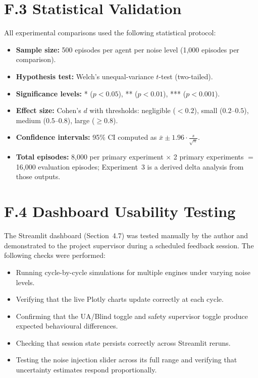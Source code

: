 \documentclass[12pt,a4paper]{report}
\begin{document}
\section*{F.3 Statistical Validation}

All experimental comparisons used the following statistical protocol:

\begin{itemize}
    \item \textbf{Sample size:} 500 episodes per agent per noise level (1,000 episodes per comparison).
    \item \textbf{Hypothesis test:} Welch's unequal-variance $t$-test (two-tailed).
    \item \textbf{Significance levels:} * ($p < 0.05$), ** ($p < 0.01$), *** ($p < 0.001$).
    \item \textbf{Effect size:} Cohen's $d$ with thresholds: negligible ($< 0.2$), small ($0.2$--$0.5$), medium ($0.5$--$0.8$), large ($\geq 0.8$).
    \item \textbf{Confidence intervals:} 95\% CI computed as $\bar{x} \pm 1.96 \cdot \frac{s}{\sqrt{n}}$.
    \item \textbf{Total episodes:} 8,000 per primary experiment $\times$ 2 primary experiments $=$ 16,000 evaluation episodes; Experiment~3 is a derived delta analysis from those outputs.
\end{itemize}

\section*{F.4 Dashboard Usability Testing}

The Streamlit dashboard (Section~4.7) was tested manually by the author and demonstrated to the project supervisor during a scheduled feedback session. The following checks were performed:

\begin{itemize}
    \item Running cycle-by-cycle simulations for multiple engines under varying noise levels.
    \item Verifying that the live Plotly charts update correctly at each cycle.
    \item Confirming that the UA/Blind toggle and safety supervisor toggle produce expected behavioural differences.
    \item Checking that session state persists correctly across Streamlit reruns.
    \item Testing the noise injection slider across its full range and verifying that uncertainty estimates respond proportionally.
\end{itemize}
\end{document}
